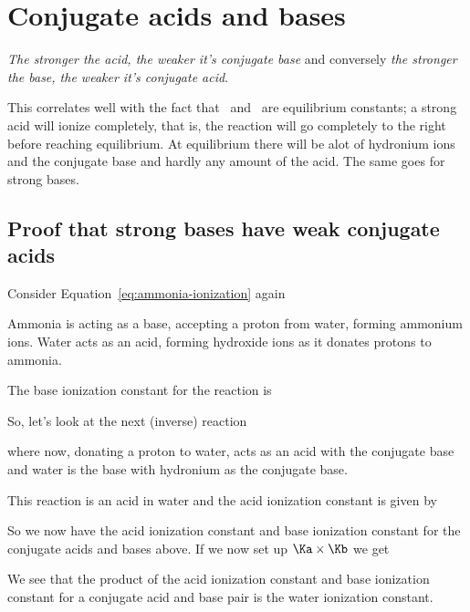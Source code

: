 \documentclass[../mit-general-chemistry.tex]{subfiles}
\begin{document}
\section{Conjugate acids and bases}


{\em The stronger the acid, the weaker it's conjugate base} and
conversely {\em the stronger the base, the weaker it's conjugate
  acid}.

This correlates well with the fact that \Ka\ and \Kb\ are equilibrium
constants; a strong acid will ionize completely, that is, the reaction
will go completely to the right before reaching equilibrium. At
equilibrium there will be alot of hydronium ions and the conjugate
base and hardly any amount of the acid. The same goes for strong
bases.



\subsection{Proof that strong bases have weak conjugate acids}


Consider Equation~\ref{eq:ammonia-ionization} again

Ammonia is acting as a base, accepting a proton from water, forming
ammonium ions. Water acts as an acid, forming hydroxide ions as it
donates protons to ammonia.

The base ionization constant for the reaction is


So, let's look at the next (inverse) reaction


where  now, donating a proton to water, acts as an acid with
the conjugate base  and water is the base with hydronium as
the conjugate base.

This reaction is an acid in water and the acid ionization constant is
given by


So we now have the acid ionization constant and base ionization
constant for the conjugate acids and bases above. If we now set up
$\Ka\times\Kb$ we get


We see that the product of the acid ionization constant and base
ionization constant for a conjugate acid and base pair is the water
ionization constant.
\end{document}

